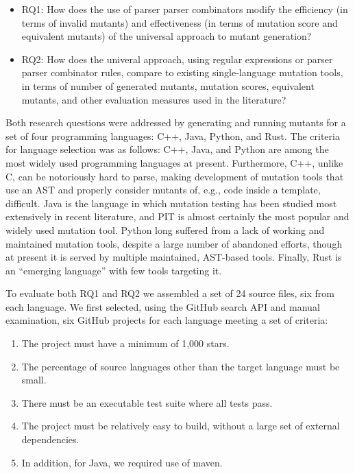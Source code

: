 \documentclass[sigconf,review, anonymous]{acmart}
\begin{document}
{\begin{itemize}

  \item{RQ1:}  How does the use of parser parser combinators modify 
    the efficiency (in terms of invalid mutants) and effectiveness (in
    terms of mutation score and equivalent mutants) of the universal
    approach to mutant generation?

\item{RQ2:}  How does the univeral approach, using regular expressions
  or parser parser combinator rules, compare to existing
  single-language mutation tools, in terms of number of generated
  mutants, mutation scores, equivalent mutants, and other evaluation measures used in the literature?

\end{itemize}


Both research questions were addressed by generating and running
mutants for a set of four programming languages: C++, Java, Python,
and Rust.  The criteria for language selection was as follows: C++,
Java, and Python are among the most widely used programming languages
at present.  Furthermore, C++, unlike C, can be notoriously hard to
parse, making development of mutation tools that use an AST and
properly consider mutants of, e.g., code inside a template,
difficult.  Java is the language in which mutation testing has been
studied most extensively in recent literature, and PIT is almost
certainly the most popular and widely used mutation tool.  Python long
suffered from a lack of working and maintained mutation tools, despite
a large number of abandoned efforts, though at present it is served by
multiple maintained, AST-based tools.  Finally, Rust is an ``emerging
language'' with few tools targeting it.

To evaluate both RQ1 and RQ2 we assembled a set of 24 source files,
six from each language.  We first selected, using the GitHub search
API and manual examination, six GitHub
projects for each language meeting a set of criteria:

\begin{enumerate}
\item The project must have a minimum of 1,000 stars.
  \item The percentage of source languages other than the target
    language must be small.
  \item There must be an executable test suite where all tests pass.
    \item The project must be relatively easy to build, without a
      large set of external dependencies.
      \item In addition, for Java, we required use of maven.
      \end{enumerate}

}
\end{document}
